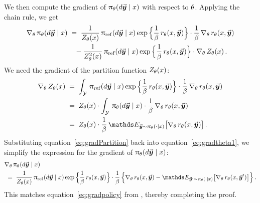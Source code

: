 		We then compute the gradient of $\uppi_{\theta}({d } \vec{\boldsymbol{y}}\!\, \mid x)$ with respect to $\theta$. Applying the chain rule, we get
		\begin{align}
			\nabla_{\theta} \,  \uppi_{\theta}({d } \vec{\boldsymbol{y}}\!\, \mid x)
			& \; = \; \frac{1}{Z_{\theta} (x)} \, \uppi_{{\rm ref}}({d } \vec{\boldsymbol{y}}\!\, \mid x)
			\exp \Big\{ \frac{1}{\beta} \, r_{\theta}(x, \vec{\boldsymbol{y}}\!\,) \Big\}
			\cdot \frac{1}{\beta} \, \nabla_{\theta} \,  r_{\theta}(x, \vec{\boldsymbol{y}}\!\,)  \notag  \\
			\label{eq:gradtheta1}
			& \quad - \frac{1}{Z_{\theta}^2(x)} \, \uppi_{{\rm ref}}({d } \vec{\boldsymbol{y}}\!\, \mid x)
			\exp \Big\{ \frac{1}{\beta} \, r_{\theta}(x, \vec{\boldsymbol{y}}\!\,) \Big\}
			\cdot \nabla_{\theta} \,  Z_{\theta}(x) \, .
		\end{align}
		We need the gradient of the partition function $Z_{\theta}(x)$:
		\begin{align}
			\gradtheta \Partitiontheta (\prompt)
			& \; = \; \int_{\ResponseSp} \, \policyref(\diff \response \mid \prompt)
			\exp \Big\{ \frac{1}{\parabeta} \, \rewardtheta(\prompt, \response) \Big\}
			\cdot \frac{1}{\parabeta} \, \gradtheta \rewardtheta(\prompt, \response)  \notag   \\
			& \; = \; \Partitiontheta (\prompt) \cdot \int_{\ResponseSp} \, \policytheta(\diff \response \mid \prompt) \cdot \frac{1}{\parabeta} \, \gradtheta \rewardtheta(\prompt, \response)  \notag   \\
			\label{eq:gradPartition}
			& \; = \; \Partitiontheta (\prompt) \cdot \frac{1}{\parabeta} \, \Exp_{\response \sim \policytheta(\cdot \mid \prompt)} \big[ \gradtheta \rewardtheta(\prompt, \response) \big] \, .
		\end{align}
		Substituting equation~\eqref{eq:gradPartition} back into equation~\eqref{eq:gradtheta1}, we simplify the expression for the gradient of $\uppi_{\theta}({d } \vec{\boldsymbol{y}}\!\, \mid x)$:
		\begin{align*}
			& \gradtheta \policytheta(\diff \response \mid \prompt)  \\
			& \; = \; \frac{1}{\Partitiontheta (\prompt)} \, \policyref(\diff \response \mid \prompt)
			\exp \Big\{ \frac{1}{\parabeta} \, \rewardtheta(\prompt, \response) \Big\}
			\cdot \frac{1}{\parabeta} \, \Big\{ \gradtheta \rewardtheta(\prompt, \response) - \Exp_{\responsenew \sim \policytheta(\cdot \mid \prompt)} \big[ \gradtheta \rewardtheta(\prompt, \responsenew) \big] \Big\} \, .
		\end{align*}
		This matches equation~\eqref{eq:gradpolicy} from , thereby completing the proof.
		
